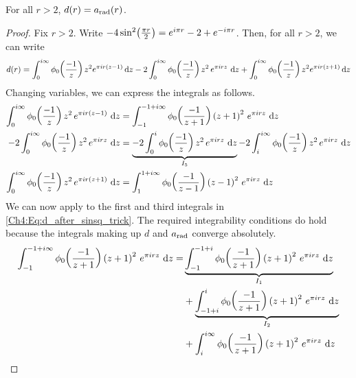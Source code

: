 \begin{boxproposition}\label{Ch4:Prop:a_eq_d}
    For all $r > 2$, $d(r) = a_{\operatorname{rad}}(r)$.
\end{boxproposition}
\begin{proof}
    Fix $r > 2$. Write $-4 \sin^2\!\left( \frac{\pi r}{2} \right) = e^{i \pi r} - 2 + e^{-i \pi r}$. Then, for all $r > 2$, we can write
    \begin{align} \small
         d(r)
         =
         \int_{0}^{i \infty} \phi_0\!\left( \frac{-1}{z} \right) z^2 e^{\pi i r \left( z - 1 \right)} \operatorname{d}\!{z}
         -2 \int_{0}^{i \infty} \phi_0\!\left( \frac{-1}{z} \right) z^2 \, e^{\pi i r z} \, \operatorname{d}\!{z}
         +
         \int_{0}^{i \infty} \phi_0\!\left( \frac{-1}{z} \right) z^2 e^{\pi i r \left( z + 1 \right)} \operatorname{d}\!{z}
         \label{Ch4:Eq:d_after_sinsq_trick}
    \end{align}
    Changing variables, we can express the integrals as follows.
    \begin{align*}
        \int_{0}^{i \infty} \phi_0\of{\frac{-1}{z}} z^2 \, e^{\pi i r \parenth{z - 1}} \, \diff{z}
        &=
        \int_{-1}^{-1 + i \infty} \phi_0\of{\frac{-1}{z + 1}} \parenth{z + 1}^2 \, e^{\pi i r z} \, \diff{z}
        \\
        -2 \int_{0}^{i \infty} \phi_0\of{\frac{-1}{z}} z^2 \, e^{\pi i r z} \, \diff{z}
        &=
        \underbrace{-2 \int_{0}^{i} \phi_0\of{\frac{-1}{z}} z^2 \, e^{\pi i r z} \, \diff{z}}_{I_5}
        -2 \int_{i}^{i \infty} \phi_0\of{\frac{-1}{z}} z^2 \, e^{\pi i r z} \, \diff{z}
        \\
        \int_{0}^{i \infty} \phi_0\of{\frac{-1}{z}} z^2 \, e^{\pi i r \parenth{z + 1}} \, \diff{z}
        &=
        \int_{1}^{1 + i \infty} \phi_0\of{\frac{-1}{z - 1}} \parenth{z - 1}^2 \, e^{\pi i r z} \, \diff{z}
    \end{align*}
    We can now apply  to the first and third integrals in \eqref{Ch4:Eq:d_after_sinsq_trick}. The required integrability conditions do hold because the integrals making up $d$ and $a_{\operatorname{rad}}$ converge absolutely.
    \begin{align*}
        \int_{-1}^{-1 + i \infty} \phi_0\of{\frac{-1}{z + 1}} \parenth{z + 1}^2 \, e^{\pi i r z} \, \diff{z}
        =& \underbrace{\int_{-1}^{-1 + i} \phi_0\of{\frac{-1}{z + 1}} \parenth{z + 1}^2 \, e^{\pi i r z} \, \diff{z}}_{I_1} \\
        &+ \underbrace{\int_{-1 + i}^{i} \phi_0\of{\frac{-1}{z + 1}} \parenth{z + 1}^2 \, e^{\pi i r z} \, \diff{z}}_{I_2} \\
        &+ \int_{i}^{i \infty} \phi_0\of{\frac{-1}{z + 1}} \parenth{z + 1}^2 \, e^{\pi i r z} \, \diff{z} \\

\end{align*}
\end{proof}
